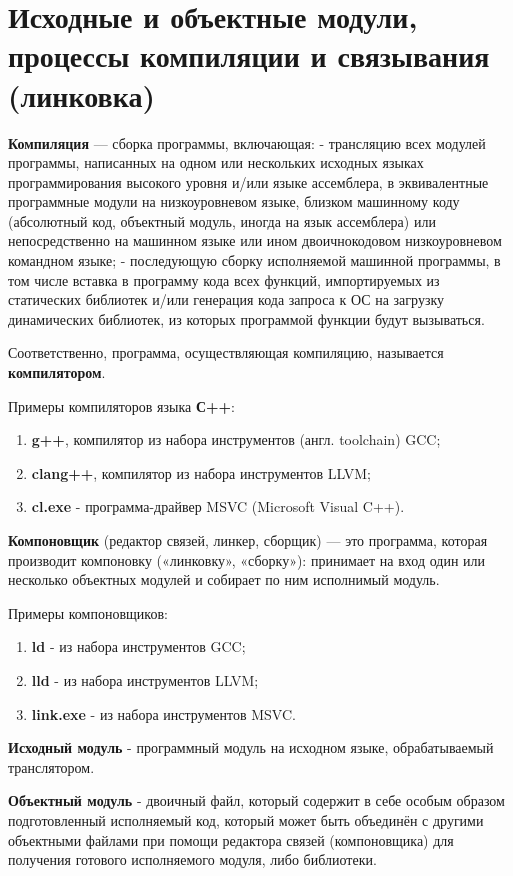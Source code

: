 \section{Исходные и объектные модули, процессы компиляции и связывания (линковка)}

\textbf{Компиляция} --- сборка программы, включающая: - трансляцию всех
модулей программы, написанных на одном или нескольких исходных языках
программирования высокого уровня и/или языке ассемблера, в эквивалентные
программные модули на низкоуровневом языке, близком машинному коду
(абсолютный код, объектный модуль, иногда на язык ассемблера) или
непосредственно на машинном языке или ином двоичнокодовом низкоуровневом
командном языке; - последующую сборку исполняемой машинной программы, в
том числе вставка в программу кода всех функций, импортируемых из
статических библиотек и/или генерация кода запроса к ОС на загрузку
динамических библиотек, из которых программой функции будут вызываться.

Соответственно, программа, осуществляющая компиляцию, называется
\textbf{компилятором}.

Примеры компиляторов языка \textbf{С++}:
\begin{enumerate}
  \item \textbf{g++}, компилятор из
  набора инструментов (англ. toolchain) GCC;
  \item \textbf{clang++},
  компилятор из набора инструментов LLVM;
  \item \textbf{cl.exe} -
  программа-драйвер MSVC (Microsoft Visual C++).
\end{enumerate}
\textbf{Компоновщик} (редактор связей, линкер, сборщик) --- это
программа, которая производит компоновку («линковку», «сборку»):
принимает на вход один или несколько объектных модулей и собирает по ним
исполнимый модуль.

Примеры компоновщиков:
\begin{enumerate}
  \item \textbf{ld} - из набора инструментов GCC;
  \item \textbf{lld} - из набора инструментов LLVM;
  \item \textbf{link.exe} - из набора инструментов MSVC.
\end{enumerate}

\textbf{Исходный модуль} - программный модуль на исходном языке,
обрабатываемый транслятором.

\textbf{Объектный модуль} - двоичный файл, который содержит в себе
особым образом подготовленный исполняемый код, который может быть
объединён с другими объектными файлами при помощи редактора связей
(компоновщика) для получения готового исполняемого модуля, либо
библиотеки.

